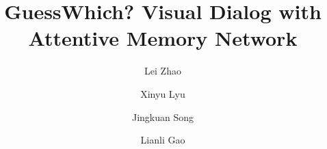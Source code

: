 \documentclass[review]{elsarticle}
\begin{document}
	 
\begin{frontmatter}
		
\title{GuessWhich? Visual Dialog with Attentive Memory Network}
		
		
\author[UESTC]{Lei Zhao}
\author[Rutgers]{Xinyu Lyu}
\author[UESTC]{Jingkuan Song}
\author[UESTC]{Lianli Gao}

\address[UESTC]{Center of Future Media, School of Computer Science and Engineering,\\ University of Electronic Science and Technology of China}
\address[Rutgers]{Rutgers, the State University of New Jersey}

	
		
\begin{abstract}


\end{abstract}
\end{frontmatter}
\end{document}
